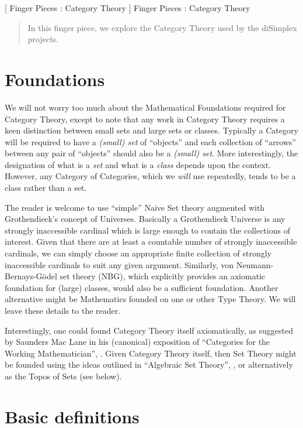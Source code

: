 
[
  Finger Pieces : Category Theory
]{
  Finger Pieces : Category Theory
}
\author{Stephen Gaito}

\maketitle

\begin{abstract}
  In this finger piece, we explore the Category Theory used by the
  diSimplex projects.
\end{abstract}

\section*{Foundations}

We will not worry too much about the Mathematical Foundations required for
Category Theory, except to note that any work in Category Theory requires a keen
distinction between small sets and large sets or classes. Typically a Category
will be required to have a \emph{(small) set} of ``objects'' and each collection
of ``arrows'' between any pair of ``objects'' should also be a \emph{(small)
set}. More interestingly, the designation of what is a \emph{set} and what is a
\emph{class} depends upon the context. However, any Category of Categories,
which we \emph{will} use repeatedly, tends to be a class rather than a set.

The reader is welcome to use ``simple'' Naive Set theory augmented with
Grothendieck's concept of Universes. Basically a Grothendieck Universe is any
strongly inaccessible cardinal which is large enough to contain the collections
of interest. Given that there are at least a countable number of strongly
inaccessible cardinals, we can simply choose an appropriate finite collection of
strongly inaccessible cardinals to suit any given argument. Similarly, von
Neumann-Bernays-Gödel set theory (NBG), which explicitly provides an axiomatic
foundation for (large) classes, would also be a sufficient foundation. Another
alternative might be Mathematics founded on one or other Type Theory. We will
leave these details to the reader.

Interestingly, one could found Category Theory itself axiomatically, as
suggested by Saunders Mac Lane in his (canonical) exposition of ``Categories for
the Working Mathematician'', \cite{macLane1971categoriesWorkingMathematician}.
Given Category Theory itself, then Set Theory might be founded using the ideas
outlined in ``Algebraic Set Theory'', \cite{joyalMoerdijk1995algSetTh}, or
alternatively as the Topos of Sets (see below).

\section*{Basic definitions}

\lpilBibliography
